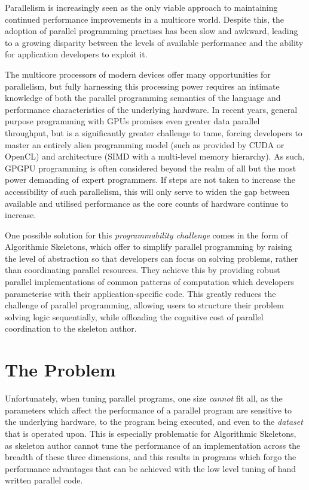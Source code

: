 Parallelism is increasingly seen as the only viable approach to
maintaining continued performance improvements in a multicore world.
Despite this, the adoption of parallel programming practises has been
slow and awkward, leading to a growing disparity between the levels of
available performance and the ability for application developers to
exploit it.

The multicore processors of modern devices offer many opportunities
for parallelism, but fully harnessing this processing power requires
an intimate knowledge of both the parallel programming semantics of
the language and performance characteristics of the underlying
hardware. In recent years, general purpose programming with GPUs
promises even greater data parallel throughput, but is a significantly
greater challenge to tame, forcing developers to master an entirely
alien programming model (such as provided by CUDA or OpenCL) and
architecture (SIMD with a multi-level memory hierarchy). As such,
GPGPU programming is often considered beyond the realm of all but the
most power demanding of expert programmers. If steps are not taken to
increase the accessibility of such parallelism, this will only serve
to widen the gap between available and utilised performance as the
core counts of hardware continue to increase.

One possible solution for this \emph{programmability challenge} comes
in the form of Algorithmic Skeletons, which offer to simplify parallel
programming by raising the level of abstraction so that developers can
focus on solving problems, rather than coordinating parallel
resources. They achieve this by providing robust parallel
implementations of common patterns of computation which developers
parameterise with their application-specific code. This greatly
reduces the challenge of parallel programming, allowing users to
structure their problem solving logic sequentially, while offloading
the cognitive cost of parallel coordination to the skeleton author.


\section{The Problem}

Unfortunately, when tuning parallel programs, one size \emph{cannot}
fit all, as the parameters which affect the performance of a parallel
program are sensitive to the underlying hardware, to the program being
executed, and even to the \emph{dataset} that is operated upon. This
is especially problematic for Algorithmic Skeletons, as skeleton
author cannot tune the performance of an implementation across the
breadth of these three dimensions, and this results in programs which
forgo the performance advantages that can be achieved with the low
level tuning of hand written parallel code.


